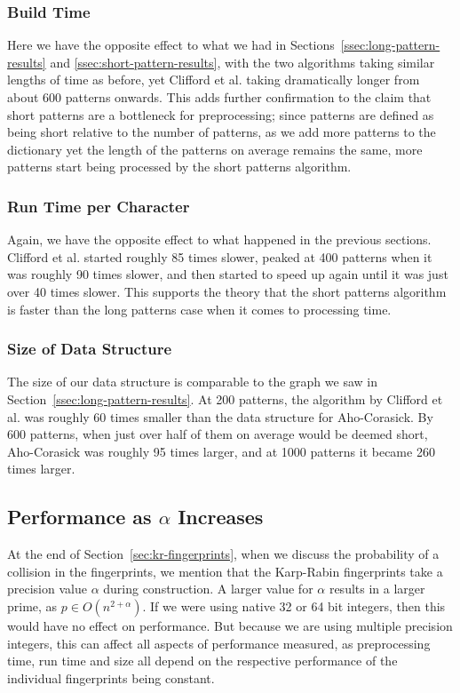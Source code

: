 \documentclass[ %
                    author={Dominic Joseph Moylett},
                    degree={MEng},
                     title={Dictionary Matching with Fingerprints},
                  subtitle={An Empirical Analysis},
                      type={research},
                      year={2015} ]{dissertation}
\begin{document}
\subsubsection{Build Time}

Here we have the opposite effect to what we had in Sections~\ref{ssec:long-pattern-results} and \ref{ssec:short-pattern-results}, with the two algorithms taking similar lengths of time as before, yet Clifford et al. taking dramatically longer from about 600 patterns onwards. This adds further confirmation to the claim that short patterns are a bottleneck for preprocessing; since patterns are defined as being short relative to the number of patterns, as we add more patterns to the dictionary yet the length of the patterns on average remains the same, more patterns start being processed by the short patterns algorithm.

\subsubsection{Run Time per Character}

Again, we have the opposite effect to what happened in the previous sections. Clifford et al. started roughly 85 times slower, peaked at 400 patterns when it was roughly 90 times slower, and then started to speed up again until it was just over 40 times slower. This supports the theory that the short patterns algorithm is faster than the long patterns case when it comes to processing time.

\subsubsection{Size of Data Structure}

The size of our data structure is comparable to the graph we saw in Section~\ref{ssec:long-pattern-results}. At 200 patterns, the algorithm by Clifford et al. was roughly 60 times smaller than the data structure for Aho-Corasick. By 600 patterns, when just over half of them on average would be deemed short, Aho-Corasick was roughly 95 times larger, and at 1000 patterns it became 260 times larger.

\subsection{Performance as $\alpha$ Increases}

At the end of Section~\ref{sec:kr-fingerprints}, when we discuss the probability of a collision in the fingerprints, we mention that the Karp-Rabin fingerprints take a precision value $\alpha$ during construction. A larger value for $\alpha$ results in a larger prime, as $p \in O(n^{2 + \alpha})$. If we were using native 32 or 64 bit integers, then this would have no effect on performance. But because we are using multiple precision integers, this can affect all aspects of performance measured, as preprocessing time, run time and size all depend on the respective performance of the individual fingerprints being constant.
\end{document}
